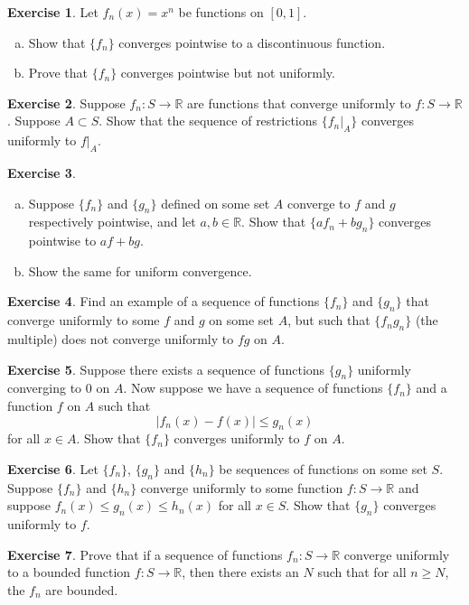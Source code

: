 \documentclass[12pt,openany]{book}
\newcommand{\abs}[1]{\left\lvert {#1} \right\rvert}
\newcommand{\R}{{\mathbb{R}}}
\theoremstyle{plain}
\theoremstyle{remark}
\theoremstyle{definition}
\newenvironment{exbox}{%
    \def\FrameCommand{\vrule width 1pt \relax\hspace{10pt}}%
    \MakeFramed{\advance\hsize-\width\FrameRestore}%
}{%
    \endMakeFramed
}
\newenvironment{exparts}{%
    \leavevmode\begin{enumerate}[a),noitemsep,topsep=0pt,parsep=0pt,partopsep=0pt]
}{%
    \end{enumerate}
}
\theoremstyle{exercise}
\newtheorem{exercise}{Exercise}[section]
\theoremstyle{example}
\begin{document}
\begin{exbox}
\begin{exercise} \label{exercise:limitnotcont}
Let $f_n(x)=x^n$ be functions on $[0,1]$.
\begin{exparts}
\item
Show that $\{ f_n \}$ converges pointwise to a discontinuous function.
\item
Prove that $\{ f_n \}$ converges
pointwise but not uniformly.
\end{exparts}
\end{exercise}

\begin{exercise}
Suppose $f_n \colon S \to \R$ are functions that converge uniformly
to $f \colon S \to \R$.  Suppose $A \subset S$.  Show that
the sequence of restrictions $\{ f_n|_A \}$ converges uniformly to $f|_A$.
\end{exercise}

\begin{exercise}
\begin{exparts}
\item
Suppose $\{ f_n \}$ and $\{ g_n \}$ defined on some set $A$ converge to
$f$ and $g$ respectively pointwise, and let $a,b \in \R$.
Show that $\{ a f_n+ b g_n \}$ converges
pointwise to $a f+ b g$.
\item
Show the same for uniform convergence.
\end{exparts}
\end{exercise}

\begin{exercise}
Find an example of a sequence of functions $\{ f_n \}$ and $\{ g_n \}$
that converge uniformly to some $f$ and $g$ on some set $A$, but such that
$\{ f_ng_n \}$ (the multiple) does not converge uniformly to $fg$ on $A$.
\end{exercise}

\begin{exercise}
Suppose there exists a sequence of functions $\{ g_n \}$ uniformly
converging to $0$ on $A$.  Now suppose we have a sequence of functions
$\{ f_n \}$ and a function $f$ on $A$ such that
\begin{equation*}
\abs{f_n(x) - f(x)} \leq g_n(x) 
\end{equation*}
for all $x \in A$.  Show that $\{ f_n \}$ converges uniformly to $f$ on $A$.
\end{exercise}

\begin{exercise}
Let $\{ f_n \}$, $\{ g_n \}$ and $\{ h_n \}$ be sequences of functions on
some set $S$.
Suppose $\{ f_n \}$ and $\{ h_n \}$ converge uniformly to some function
$f \colon S \to \R$ and suppose $f_n(x) \leq g_n(x) \leq h_n(x)$
for all $x \in S$.  Show that $\{ g_n \}$ converges uniformly to $f$.
\end{exercise}

\begin{exercise}
Prove that
if a sequence of functions $f_n \colon S \to \R$
converge uniformly to a bounded function $f \colon S \to \R$,
then there exists an $N$ such that for all $n \geq N$, the $f_n$
are bounded.
\end{exercise}
\end{exbox}
\end{document}
